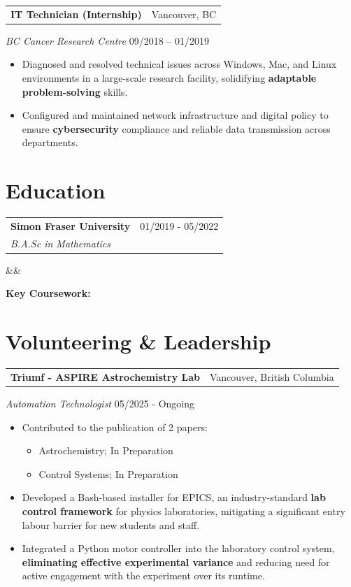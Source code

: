 \documentclass[a4paper,10pt]{article}
\makeatletter
\newcommand{\education}[4]{%
	\vspace{1.5mm}
	\noindent
	\begin{tabular*}{\textwidth}{@{\extracolsep{\fill}} l r}
		\textbf{#1} & #2 \\
		\textit{#3} & \\
	\end{tabular*}%
	\ifx&#4&%
	\else
	\vspace{0.5mm}
	
	\hspace*{4mm}\textbf{Key Coursework:}
	\vspace{-3.5mm}
	
	\begin{itemize}
		\setlength{\itemsep}{0pt}
		\setlength{\topsep}{1pt}
		\setlength{\parsep}{0pt}
		\setlength{\leftskip}{4mm}
		#4
	\end{itemize}
	\fi
	\vspace{-2.5mm}
}
\newcommand{\leadership}[5]{
	{
		\vspace{1.5mm}
		\noindent
		\begin{tabular*}{\textwidth}{@{\extracolsep{\fill}} l r}
			\textbf{#1} & #2 \\
		\end{tabular*}
		
		\noindent\textit{#3} \hfill #4 \\
		\vspace{-5mm}
		\begin{itemize}
			
			\setlength{\itemsep}{-1mm}   %
			\setlength{\topsep}{-4mm}
			\setlength{\parsep}{0mm}
			#5
		\end{itemize}
	}
}
\newcommand{\work}[5]{
	{
		\vspace{1.5mm}
		\noindent
		\begin{tabular*}{\textwidth}{@{\extracolsep{\fill}} l r}
			\textbf{#1} & #2 \\
		\end{tabular*}
		\vspace{-5mm}
		\textit{#3} \hfill #4 \\
		\begin{itemize}
			\setlength{\itemsep}{-1mm}
			\setlength{\topsep}{0mm}
			\setlength{\parsep}{0mm}
			#5
		\end{itemize}
	}
}
\makeatother
\begin{document}
	\work
	{IT Technician (Internship)}
	{Vancouver, BC}
	{BC Cancer Research Centre}
	{09/2018 – 01/2019}
	{
		\item Diagnosed and resolved technical issues across Windows, Mac, and Linux environments in a large-scale research facility, solidifying \textbf{adaptable problem-solving} skills.
		
		\item Configured and maintained network infrastructure and digital policy to ensure \textbf{cybersecurity} compliance and reliable data transmission across departments.
	}

\breaker	
\section*{Education}
	
	\education
		{Simon Fraser University}
		{01/2019 - 05/2022}
		{B.A.Sc  in Mathematics}
		{}
	\vspace{0.5em}

\breaker
\section*{Volunteering \& Leadership}

	\leadership
	{Triumf - ASPIRE Astrochemistry Lab}
	{Vancouver, British Columbia}
	{Automation Technologist}
	{05/2025 - Ongoing}
	{	
		\item Contributed to the publication of 2 papers: 
		\begin{itemize}\vspace{-0.5em}
			\item Astrochemistry; In Preparation 
			\item Control Systems; In Preparation
		\end{itemize}
		\item Developed a Bash-based installer for EPICS, an industry-standard \textbf{lab control framework }for physics laboratories, mitigating a significant entry labour barrier for new students and staff.
		
		\item Integrated a Python motor controller into the laboratory control system, \textbf{eliminating effective experimental variance} and reducing need for active engagement with the experiment over its runtime.
	}
\end{document}
